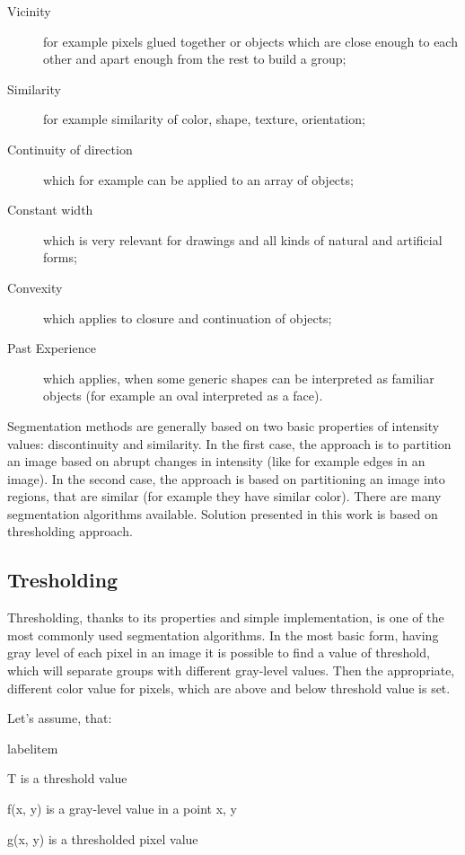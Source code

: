 \documentclass[a4paper,onecolumn,oneside,12pt]{memoir}
\makeatletter
\renewenvironment{itemize}{
  \begin{list}{  
  \csname labelitem\romannumeral\the\@listdepth\endcsname}{
  \setlength{\leftmargin}{1em}
	\setlength{\topsep}{6pt}%
	\setlength{\partopsep}{0pt}%
	\setlength{\parskip}{0pt}%
	\setlength{\parsep}{0pt}%
	\setlength{\itemsep}{0pt}}
}{
  \end{list}
}
\makeatother
\begin{document}
\begin{description}
  \item[Vicinity] for example pixels glued together or objects which are close enough to each other
        and apart enough from the rest to build a group;
  \item[Similarity] for example similarity of color, shape, texture, orientation;
  \item[Continuity of direction] which for example can be applied to an array of objects;
  \item[Constant width] which is very relevant for drawings and all kinds of natural and artificial
        forms;
  \item[Convexity] which applies to closure and continuation of objects;
  \item[Past Experience] which applies, when some generic shapes can be interpreted as familiar
        objects (for example an oval interpreted as a face).
\end{description}

Segmentation methods \cite{digitalImageProcessing} are generally based on two basic properties of intensity values:
discontinuity and similarity. In the first case, the approach is to partition an image based on
abrupt changes in intensity (like for example edges in an image). In the second case, the approach is
based on partitioning an image into regions, that are similar (for example they have similar color).
There are many segmentation algorithms available. Solution presented in this work is based on
thresholding approach.

\subsection{Tresholding}

Thresholding, thanks to its properties and simple implementation, is one of the most commonly used
segmentation algorithms. In the most basic form, having gray level of each pixel in an image it is
possible to find a value of threshold, which will separate groups with different gray-level values.
Then the appropriate, different color value for pixels, which are above and below threshold value
is set.

Let's assume, that:
\begin{itemize}
  \item T is a threshold value
  \item f(x, y) is a gray-level value in a point x, y
  \item g(x, y) is a thresholded pixel value
\end{itemize}
\end{document}
